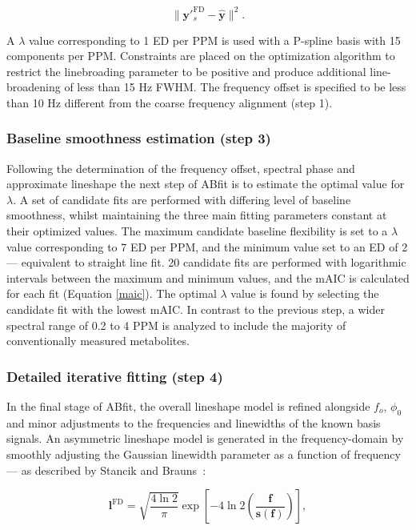 \documentclass[num-refs]{wiley-article}
\begin{document}
\begin{equation}
  \| \textbf{y}'^{\mathrm{FD}}_{s}  - \hat{\textbf{y}} \|^{2}.
  \label{obj_fn}
\end{equation}

A $\lambda$ value corresponding to 1 ED per PPM is used with a P-spline basis with 15 components per PPM. Constraints are placed on the optimization algorithm to restrict the linebroading parameter to be positive and produce additional line-broadening of less than 15 Hz FWHM. The frequency offset is specified to be less than 10 Hz different from the coarse frequency alignment (step 1).

\subsubsection{Baseline smoothness estimation (step 3)}
Following the determination of the frequency offset, spectral phase and approximate lineshape the next step of ABfit is to estimate the optimal value for $\lambda$. A set of candidate fits are performed with differing level of baseline smoothness, whilst maintaining the three main fitting parameters constant at their optimized values. The maximum candidate baseline flexibility is set to a $\lambda$ value corresponding to 7 ED per PPM, and the minimum value set to an ED of 2 --- equivalent to straight line fit. 20 candidate fits are performed with logarithmic intervals between the maximum and minimum values, and the mAIC is calculated for each fit (Equation \ref{maic}). The optimal $\lambda$ value is found by selecting the candidate fit with the lowest mAIC. In contrast to the previous step, a wider spectral range of 0.2 to 4 PPM is analyzed to include the majority of conventionally measured metabolites.

\subsubsection{Detailed iterative fitting (step 4)}
In the final stage of ABfit, the overall lineshape model is refined alongside $f_{o}$, $\phi_{0}$ and minor adjustments to the frequencies and linewidths of the known basis signals. An asymmetric lineshape model is generated in the frequency-domain by smoothly adjusting the Gaussian linewidth parameter as a function of frequency --- as described by Stancik and Brauns~\cite{Stancik2008}:

\begin{equation}
  \mathbf{l}^{\mathrm{FD}} = \sqrt{\frac{4 \ln 2}{\pi}} \exp \left[ -4 \ln2 \left( \frac{\mathbf{f}}{\mathbf{s}(\mathbf{f})} \right) \right],
\end{equation}
\end{document}
